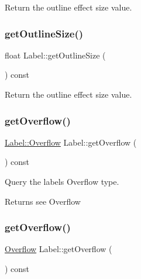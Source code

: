 Return the outline effect size value. \mbox{\label{classLabel_a0c123c000a66417e27562a3e983c6872}} 
\subsubsection{\texorpdfstring{get\+Outline\+Size()}{getOutlineSize()}\hspace{0.1cm}{\footnotesize\ttfamily [2/2]}}
{\footnotesize\ttfamily float Label\+::get\+Outline\+Size (\begin{DoxyParamCaption}{ }\end{DoxyParamCaption}) const\hspace{0.3cm}{\ttfamily [inline]}}

Return the outline effect size value. \mbox{\label{classLabel_afe15310c5d9d4009bfe544ba9f342490}} 
\subsubsection{\texorpdfstring{get\+Overflow()}{getOverflow()}\hspace{0.1cm}{\footnotesize\ttfamily [1/2]}}
{\footnotesize\ttfamily \hyperlink{classLabel_af7d31998ea743e8ca64eb1a983fa6a4c}{Label\+::\+Overflow} Label\+::get\+Overflow (\begin{DoxyParamCaption}{ }\end{DoxyParamCaption}) const}

Query the label\textquotesingle{}s Overflow type.

\begin{DoxyReturn}{Returns}
see {\ttfamily Overflow} 
\end{DoxyReturn}
\mbox{\label{classLabel_a7645d8e62f623c8ac0d543f83b82fcae}} 
\subsubsection{\texorpdfstring{get\+Overflow()}{getOverflow()}\hspace{0.1cm}{\footnotesize\ttfamily [2/2]}}
{\footnotesize\ttfamily \hyperlink{classLabel_af7d31998ea743e8ca64eb1a983fa6a4c}{Overflow} Label\+::get\+Overflow (\begin{DoxyParamCaption}{ }\end{DoxyParamCaption}) const}

